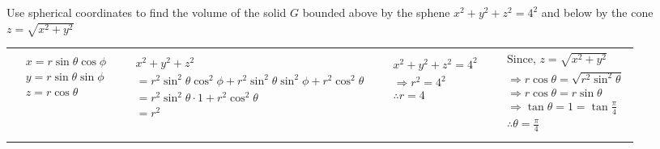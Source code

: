 \documentclass[11pt]{extarticle}
\begin{document}
\pagebreak
\textbf{} Use spherical coordinates to find the volume of the solid $G$ bounded above by the sphene $x^2+y^2+z^2=4^2$ and below by the cone $z=\sqrt{x^2+y^2}$

\vspace{-0.5\baselineskip}
\begin{tabularx}{\textwidth}{p{2.87cm}|X|p{3.07cm}|p{3.75cm}}
   \begin{adjustbox}{valign=t}
      $\begin{aligned}\\
         & x=r \sin \theta \cos \phi \\
         & y=r \sin \theta \sin \phi \\
         & z=r \cos \theta
      \end{aligned}$
   \end{adjustbox}
   &
   \begin{adjustbox}{valign=t}
      $\begin{aligned}\\
         & x^2+y^2+z^2\\
         & = r^2\sin^2\theta\cos^2\phi+r^2\sin^2\theta\sin^2\phi+r^2\cos^2\theta\\
         & = r^2\sin^2\theta\cdot 1+r^2\cos^2\theta\\
         & = r^2
      \end{aligned}$
   \end{adjustbox}
   &
   \begin{adjustbox}{valign=t}
      $\begin{aligned}\\
         & x^2+y^2+z^2=4^2 \\
         & \Rightarrow r^2=4^2 \\
         & \therefore r=4 \\
      \end{aligned}$
   \end{adjustbox}
   &
   \begin{adjustbox}{valign=t}
      $\begin{aligned}
         &\text{Since, \ } z=\sqrt{x^2+y^2}\\
         & \Rightarrow r\cos\theta = \sqrt{r^2\sin^2\theta}\\
         & \Rightarrow r\cos\theta = r\sin\theta\\
         & \Rightarrow \tan\theta = 1 =\tan\frac{\pi}{4}\\
         & \therefore \theta = \frac{\pi}{4}\\
      \end{aligned}$
   \end{adjustbox}
\end{tabularx}
\end{document}
